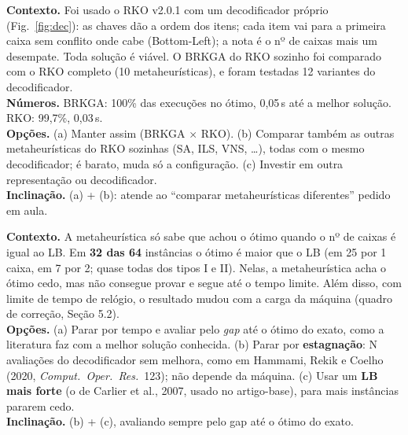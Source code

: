 \documentclass[11pt,a4paper]{article}
\begin{document}
\textbf{Contexto.} Foi usado o RKO v2.0.1 com um decodificador próprio (Fig.~\ref{fig:dec}): as chaves dão a ordem dos
itens; cada item vai para a primeira caixa sem conflito onde cabe (Bottom-Left); a nota é o nº de caixas mais um
desempate. Toda solução é viável. O BRKGA do RKO sozinho foi comparado com o RKO completo (10 metaheurísticas), e
foram testadas 12 variantes do decodificador.\\
\textbf{Números.} BRKGA: 100\% das execuções no ótimo, 0,05\,s até a melhor solução. RKO: 99,7\%, 0,03\,s.\\
\textbf{Opções.} (a) Manter assim (BRKGA $\times$ RKO). (b) Comparar também as outras metaheurísticas do RKO
sozinhas (SA, ILS, VNS, \dots), todas com o mesmo decodificador; é barato, muda só a configuração.
(c) Investir em outra representação ou decodificador.\\
\textbf{Inclinação.} (a) + (b): atende ao ``comparar metaheurísticas diferentes'' pedido em aula.
\resposta

\textbf{Contexto.} A metaheurística só sabe que achou o ótimo quando o nº de caixas é igual ao LB. Em
\textbf{32 das 64} instâncias o ótimo é maior que o LB (em 25 por 1 caixa, em 7 por 2; quase todas dos tipos I e
II). Nelas, a metaheurística acha o ótimo cedo, mas não consegue provar e segue até o tempo limite. Além disso,
com limite de tempo de relógio, o resultado mudou com a carga da máquina (quadro de correção, Seção 5.2).\\
\textbf{Opções.} (a) Parar por tempo e avaliar pelo \emph{gap} até o ótimo do exato, como a literatura faz com a
melhor solução conhecida. (b) Parar por \textbf{estagnação}: N avaliações do decodificador sem melhora, como em
Hammami, Rekik e Coelho (2020, \emph{Comput.\ Oper.\ Res.}\ 123); não depende da máquina. (c) Usar um
\textbf{LB mais forte} (o de Carlier et al., 2007, usado no artigo-base), para mais instâncias pararem cedo.\\
\textbf{Inclinação.} (b) + (c), avaliando sempre pelo gap até o ótimo do exato.
\resposta
\end{document}
